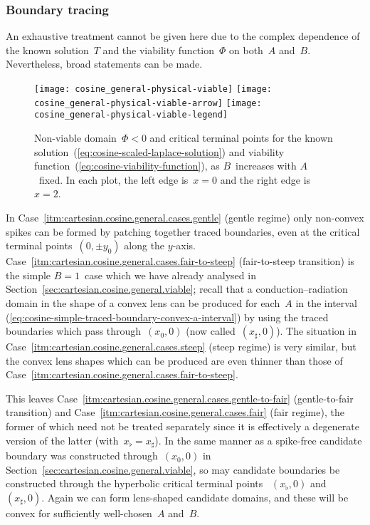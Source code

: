 \subsubsection{Boundary tracing}
\label{sec:cartesian.cosine.general.tracing}

An exhaustive treatment cannot be given here
due to the complex dependence
of the known solution~$T$ and the viability function~$\Phi$
on both~$A$ and~$B$.
Nevertheless, broad statements can be made.

\begin{figure}
  \centering
  \texttt{[image: cosine\_general-physical-viable]}
  \texttt{[image: cosine\_general-physical-viable-arrow]}
  \texttt{[image: cosine\_general-physical-viable-legend]}
  \caption{
    Non-viable domain~$\Phi < 0$ and critical terminal points
    for the known solution~(\ref{eq:cosine-scaled-laplace-solution})
    and viability function~(\ref{eq:cosine-viability-function}),
    as $B$~increases with $A$~fixed.
    In each plot, the left edge is~$x = 0$ and the right edge is~$x = 2$.
  }
  \label{fig:cosine_general-physical-viable}
\end{figure}

In Case~\ref{itm:cartesian.cosine.general.cases.gentle} (gentle regime)
only non-convex spikes can be formed
by patching together traced boundaries,
even at the critical terminal points~$(0, \pm y_0)$ along the $y$-axis.
Case~\ref{itm:cartesian.cosine.general.cases.fair-to-steep}
  (fair-to-steep transition)
is the simple $B = 1$~case which we have already analysed
in Section~\ref{sec:cartesian.cosine.general.viable};
recall that a conduction--radiation domain in the shape of a convex lens
can be produced for each~$A$ in the interval~%
  (\ref{eq:cosine-simple-traced-boundary-convex-a-interval})
by using the traced boundaries which pass through~$(x_0, 0)$
(now called~$(x_\sharp, 0)$).
The situation in
Case~\ref{itm:cartesian.cosine.general.cases.steep} (steep regime)
is very similar,
but the convex lens shapes which can be produced
are even thinner than those of
Case~\ref{itm:cartesian.cosine.general.cases.fair-to-steep}.

This leaves
Case~\ref{itm:cartesian.cosine.general.cases.gentle-to-fair}
  (gentle-to-fair transition)
and
Case~\ref{itm:cartesian.cosine.general.cases.fair} (fair regime),
the former of which need not be treated separately
since it is effectively a degenerate version of the latter
(with~$x_\flat = x_\sharp$).
In the same manner as a spike-free candidate boundary
was constructed through~$(x_0, 0)$
in Section~\ref{sec:cartesian.cosine.general.viable},
so may candidate boundaries be constructed
through the hyperbolic critical terminal points~%
  $(x_\flat, 0)$ and~$(x_\sharp, 0)$.
Again we can form lens-shaped candidate domains,
and these will be convex for sufficiently well-chosen~$A$ and~$B$.


